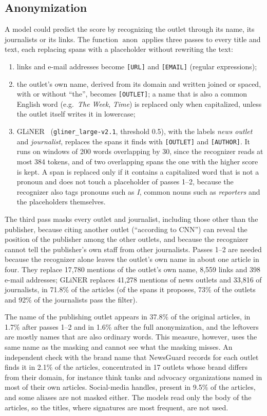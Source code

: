 \documentclass[11pt,a4paper]{article}
\newcommand{\anon}{\operatorname{anon}}
\begin{document}
\subsection{Anonymization}\label{sec:anon}
A model could predict the score by recognizing the outlet through its name, its journalists or its links. The function $\anon$ applies three passes to every title and text, each replacing spans with a placeholder without
rewriting the text:
\begin{enumerate}
  \item links and e-mail addresses become \texttt{[URL]} and \texttt{[EMAIL]} (regular expressions);
  \item the outlet's own name, derived from its domain and written joined or spaced, with or without ``the'', becomes
        \texttt{[OUTLET]}; a name that is also a common English word (e.g.\ \emph{The Week}, \emph{Time}) is replaced only
        when capitalized, unless the outlet itself writes it in lowercase;
  \item GLiNER~\cite{zaratiana2024gliner} (\texttt{gliner\_large-v2.1}, threshold 0.5), with the labels \emph{news
        outlet} and \emph{journalist}, replaces the spans it finds with \texttt{[OUTLET]} and \texttt{[AUTHOR]}. It runs
        on windows of 200 words overlapping by 30, since the recognizer reads at most 384 tokens, and of two
        overlapping spans the one with the higher score is kept. A span is replaced only if it contains a capitalized
        word that is not a pronoun and does not touch a placeholder of passes 1--2, because the recognizer also tags
        pronouns such as \emph{I}, common nouns such as \emph{reporters} and the placeholders themselves.
\end{enumerate}
The third pass masks every outlet and journalist, including those other than the publisher, because citing another
outlet (``according to CNN'') can reveal the position of the publisher among the other outlets, and because the
recognizer cannot tell the publisher's own staff from other journalists. Passes 1--2 are needed because the recognizer
alone leaves the outlet's own name in about one article in four. They replace 17,780 mentions of the outlet's own name,
8,559 links and 398 e-mail addresses; GLiNER replaces 41,278 mentions of news outlets and 33,816 of journalists, in
71.8\% of the articles (of the spans it proposes, 73\% of the outlets and 92\% of the journalists pass the filter).

The name of the publishing outlet appears in 37.8\% of the original articles, in 1.7\% after passes 1--2 and in 1.6\%
after the full anonymization, and the leftovers are mostly names that are also ordinary words. This measure, however,
uses the same name as the masking and cannot see what the masking misses. An independent check with the brand name that
NewsGuard records for each outlet finds it in 2.1\% of the articles, concentrated in 17 outlets whose brand differs from
their domain, for instance think tanks and advocacy organizations named in most of their own articles. Social-media
handles, present in 9.5\% of the articles, and some aliases are not masked either. The models read only the body of the
articles, so the titles, where signatures are most frequent, are not used.
\end{document}
